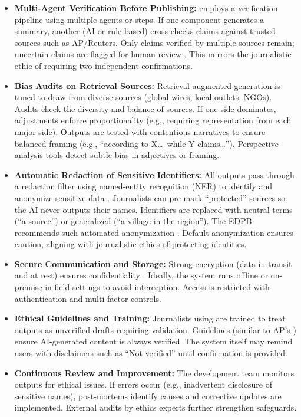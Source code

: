 \begin{itemize}
    \item \textbf{Multi-Agent Verification Before Publishing:} \ishtar{} employs a verification pipeline using multiple agents or steps. If one component generates a summary, another (AI or rule-based) cross-checks claims against trusted sources such as AP/Reuters. Only claims verified by multiple sources remain; uncertain claims are flagged for human review \cite{ap2023}. This mirrors the journalistic ethic of requiring two independent confirmations.

    \item \textbf{Bias Audits on Retrieval Sources:} Retrieval-augmented generation is tuned to draw from diverse sources (global wires, local outlets, NGOs). Audits check the diversity and balance of sources. If one side dominates, adjustments enforce proportionality (e.g., requiring representation from each major side). Outputs are tested with contentious narratives to ensure balanced framing (e.g., ``according to X\ldots\ while Y claims\ldots''). Perspective analysis tools detect subtle bias in adjectives or framing.

    \item \textbf{Automatic Redaction of Sensitive Identifiers:} All outputs pass through a redaction filter using named-entity recognition (NER) to identify and anonymize sensitive data \cite{edpb2022}. Journalists can pre-mark ``protected'' sources so the AI never outputs their names. Identifiers are replaced with neutral terms (``a source'') or generalized (``a village in the region''). The EDPB recommends such automated anonymization \cite{edpb2022}. Default anonymization ensures caution, aligning with journalistic ethics of protecting identities.

    \item \textbf{Secure Communication and Storage:} Strong encryption (data in transit and at rest) ensures confidentiality \cite{edpb2022}. Ideally, the system runs offline or on-premise in field settings to avoid interception. Access is restricted with authentication and multi-factor controls.

    \item \textbf{Ethical Guidelines and Training:} Journalists using \ishtar{} are trained to treat outputs as unverified drafts requiring validation. Guidelines (similar to AP's \cite{ap2023}) ensure AI-generated content is always verified. The system itself may remind users with disclaimers such as ``Not verified'' until confirmation is provided.

    \item \textbf{Continuous Review and Improvement:} The development team monitors outputs for ethical issues. If errors occur (e.g., inadvertent disclosure of sensitive names), post-mortems identify causes and corrective updates are implemented. External audits by ethics experts further strengthen safeguards.
\end{itemize}

